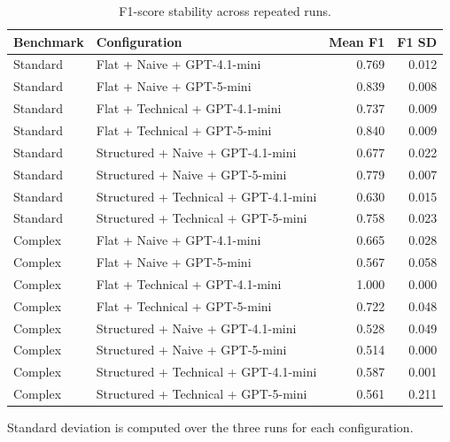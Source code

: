 \begin{table}[htbp]
\centering
\small
\caption{F1-score stability across repeated runs.}
\label{tab:f1-stability}
\begin{tabular}{llrr}
\toprule
Benchmark & Configuration & Mean F1 & F1 SD \\
\midrule
Standard & Flat + Naive + GPT-4.1-mini & 0.769 & 0.012 \\
Standard & Flat + Naive + GPT-5-mini & 0.839 & 0.008 \\
Standard & Flat + Technical + GPT-4.1-mini & 0.737 & 0.009 \\
Standard & Flat + Technical + GPT-5-mini & 0.840 & 0.009 \\
Standard & Structured + Naive + GPT-4.1-mini & 0.677 & 0.022 \\
Standard & Structured + Naive + GPT-5-mini & 0.779 & 0.007 \\
Standard & Structured + Technical + GPT-4.1-mini & 0.630 & 0.015 \\
Standard & Structured + Technical + GPT-5-mini & 0.758 & 0.023 \\
Complex & Flat + Naive + GPT-4.1-mini & 0.665 & 0.028 \\
Complex & Flat + Naive + GPT-5-mini & 0.567 & 0.058 \\
Complex & Flat + Technical + GPT-4.1-mini & 1.000 & 0.000 \\
Complex & Flat + Technical + GPT-5-mini & 0.722 & 0.048 \\
Complex & Structured + Naive + GPT-4.1-mini & 0.528 & 0.049 \\
Complex & Structured + Naive + GPT-5-mini & 0.514 & 0.000 \\
Complex & Structured + Technical + GPT-4.1-mini & 0.587 & 0.001 \\
Complex & Structured + Technical + GPT-5-mini & 0.561 & 0.211 \\
\bottomrule
\end{tabular}
\par\footnotesize{Standard deviation is computed over the three runs for each configuration.}
\end{table}
